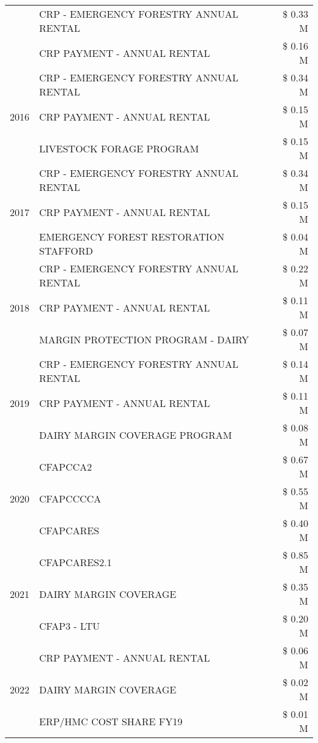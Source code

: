 \begin{tabular}{llr}
 & CRP - EMERGENCY FORESTRY ANNUAL RENTAL & \$ 0.33 M \\
 & CRP PAYMENT - ANNUAL RENTAL & \$ 0.16 M \\
\cline{1-3}
\multirow[t]{3}{*}{2016} & CRP - EMERGENCY FORESTRY ANNUAL RENTAL & \$ 0.34 M \\
 & CRP PAYMENT - ANNUAL RENTAL & \$ 0.15 M \\
 & LIVESTOCK FORAGE PROGRAM & \$ 0.15 M \\
\cline{1-3}
\multirow[t]{3}{*}{2017} & CRP - EMERGENCY FORESTRY ANNUAL RENTAL & \$ 0.34 M \\
 & CRP PAYMENT - ANNUAL RENTAL & \$ 0.15 M \\
 & EMERGENCY FOREST RESTORATION STAFFORD & \$ 0.04 M \\
\cline{1-3}
\multirow[t]{3}{*}{2018} & CRP - EMERGENCY FORESTRY ANNUAL RENTAL & \$ 0.22 M \\
 & CRP PAYMENT - ANNUAL RENTAL & \$ 0.11 M \\
 & MARGIN PROTECTION PROGRAM - DAIRY & \$ 0.07 M \\
\cline{1-3}
\multirow[t]{3}{*}{2019} & CRP - EMERGENCY FORESTRY ANNUAL RENTAL & \$ 0.14 M \\
 & CRP PAYMENT - ANNUAL RENTAL & \$ 0.11 M \\
 & DAIRY MARGIN COVERAGE PROGRAM & \$ 0.08 M \\
\cline{1-3}
\multirow[t]{3}{*}{2020} & CFAPCCA2 & \$ 0.67 M \\
 & CFAPCCCCA & \$ 0.55 M \\
 & CFAPCARES & \$ 0.40 M \\
\cline{1-3}
\multirow[t]{3}{*}{2021} & CFAPCARES2.1 & \$ 0.85 M \\
 & DAIRY MARGIN COVERAGE & \$ 0.35 M \\
 & CFAP3 - LTU & \$ 0.20 M \\
\cline{1-3}
\multirow[t]{3}{*}{2022} & CRP PAYMENT - ANNUAL RENTAL & \$ 0.06 M \\
 & DAIRY MARGIN COVERAGE & \$ 0.02 M \\
 & ERP/HMC COST SHARE FY19 & \$ 0.01 M \\
\cline{1-3}
\bottomrule
\end{tabular}
